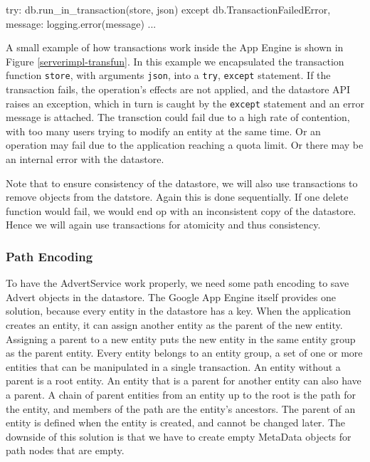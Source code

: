 \begin{figure*}[ht] %
\begin{center}
\begin{code}
try:
  db.run_in_transaction(store, json) 
except db.TransactionFailedError, message:
  logging.error(message)
  ...
\end{code}
\caption{Transactions.\label{serverimpl-transfun}}
\end{center}
\end{figure*}

A small example of how transactions work inside the App Engine is shown in Figure
\ref{serverimpl-transfun}. In this example we encapsulated the transaction
function \texttt{store}, with arguments \texttt{json}, into a \texttt{try},
\texttt{except} statement. If the transaction fails, the operation's effects are not
applied, and the datastore API raises an exception, which in turn is caught by
the \texttt{except} statement and an error message is attached. The transction
could fail due to a high rate of contention, with too many users trying
to modify an entity at the same time. Or an operation may fail due to the
application reaching a quota limit. Or there may be an internal error with the
datastore.

Note that to ensure consistency of the datastore, we will also use transactions
to remove objects from the datstore. Again this is done sequentially. If one
delete function would fail, we would end op with an inconsistent copy of the
datastore. Hence we will again use transactions for atomicity and thus
consistency.

\subsubsection{Path Encoding}
To have the AdvertService work properly, we need some path encoding to save
Advert objects in the datastore. The Google App Engine itself provides one
solution, because every entity in the datastore has a key. When the application
creates an entity, it can assign another entity as the parent of the new entity.
Assigning a parent to a new entity puts the new entity in the same entity group
as the parent entity. Every entity belongs to an entity group, a set of one or
more entities that can be manipulated in a single transaction. An entity without
a parent is a root entity. An entity that is a parent for another entity can also
have a parent. A chain of parent entities from an entity up to the root is the
path for the entity, and members of the path are the entity's ancestors. The
parent of an entity is defined when the entity is created, and cannot be changed
later. The downside of this solution is that we have to create empty MetaData
objects for path nodes that are empty.

